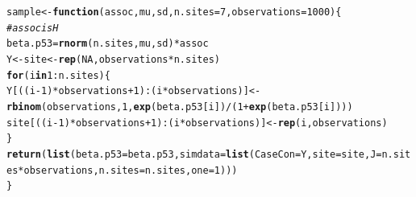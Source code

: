 \documentclass[AMA,STIX1COL]{WileyNJD-v2}\usepackage[]{graphicx}\usepackage[]{color}
\makeatletter
\newcommand{\hlnum}[1]{\textcolor[rgb]{0.686,0.059,0.569}{#1}}%
\newcommand{\hlcom}[1]{\textcolor[rgb]{0.678,0.584,0.686}{\textit{#1}}}%
\newcommand{\hlopt}[1]{\textcolor[rgb]{0,0,0}{#1}}%
\newcommand{\hlstd}[1]{\textcolor[rgb]{0.345,0.345,0.345}{#1}}%
\newcommand{\hlkwa}[1]{\textcolor[rgb]{0.161,0.373,0.58}{\textbf{#1}}}%
\newcommand{\hlkwb}[1]{\textcolor[rgb]{0.69,0.353,0.396}{#1}}%
\newcommand{\hlkwc}[1]{\textcolor[rgb]{0.333,0.667,0.333}{#1}}%
\newcommand{\hlkwd}[1]{\textcolor[rgb]{0.737,0.353,0.396}{\textbf{#1}}}%
\newenvironment{kframe}{%
 \def\at@end@of@kframe{}%
 \ifinner\ifhmode%
  \def\at@end@of@kframe{\end{minipage}}%
  \begin{minipage}{\columnwidth}%
 \fi\fi%
 \def\FrameCommand##1{\hskip\@totalleftmargin \hskip-\fboxsep
 \colorbox{shadecolor}{##1}\hskip-\fboxsep
     \hskip-\linewidth \hskip-\@totalleftmargin \hskip\columnwidth}%
 \MakeFramed {\advance\hsize-\width
   \@totalleftmargin\z@ \linewidth\hsize
   \@setminipage}}%
 {\par\unskip\endMakeFramed%
 \at@end@of@kframe}
\newenvironment{knitrout}{}{} %
\makeatother
\begin{document}
\begin{knitrout}
\begin{kframe}
\begin{alltt}
\hlstd{sample}\hlkwb{<-} \hlkwa{function}\hlstd{(}\hlkwc{assoc}\hlstd{,} \hlkwc{mu}\hlstd{,} \hlkwc{sd}\hlstd{,} \hlkwc{n.sites}\hlstd{=}\hlnum{7}\hlstd{,}\hlkwc{observations} \hlstd{=} \hlnum{1000}\hlstd{)\{}
  \hlcom{#assoc is H}
  \hlstd{beta.p53} \hlkwb{=} \hlkwd{rnorm}\hlstd{(n.sites,mu,sd)}\hlopt{*}\hlstd{assoc}
  \hlstd{Y} \hlkwb{<-}\hlstd{site} \hlkwb{<-} \hlkwd{rep}\hlstd{(}\hlnum{NA}\hlstd{, observations}\hlopt{*}\hlstd{n.sites)}
  \hlkwa{for}\hlstd{(i} \hlkwa{in} \hlnum{1}\hlopt{:}\hlstd{n.sites)\{}
    \hlstd{Y[((i}\hlopt{-}\hlnum{1}\hlstd{)}\hlopt{*}\hlstd{observations}\hlopt{+}\hlnum{1}\hlstd{)}\hlopt{:}\hlstd{(i}\hlopt{*}\hlstd{observations)]}\hlkwb{<-}\hlkwd{rbinom}\hlstd{(observations,} \hlnum{1}\hlstd{,} \hlkwd{exp}\hlstd{(beta.p53[i])}\hlopt{/}\hlstd{(}\hlnum{1}\hlopt{+}\hlkwd{exp}\hlstd{(beta.p53[i])))}
    \hlstd{site[((i}\hlopt{-}\hlnum{1}\hlstd{)}\hlopt{*}\hlstd{observations}\hlopt{+}\hlnum{1}\hlstd{)}\hlopt{:}\hlstd{(i}\hlopt{*}\hlstd{observations)]}\hlkwb{<-} \hlkwd{rep}\hlstd{(i, observations)}
  \hlstd{\}}
  \hlkwd{return}\hlstd{(}\hlkwd{list}\hlstd{(}\hlkwc{beta.p53}\hlstd{=beta.p53,} \hlkwc{simdata} \hlstd{=} \hlkwd{list}\hlstd{(}\hlkwc{CaseCon}\hlstd{=Y,} \hlkwc{site}\hlstd{=site,}  \hlkwc{J}\hlstd{=n.sites}\hlopt{*}\hlstd{observations ,}\hlkwc{n.sites}\hlstd{=n.sites,} \hlkwc{one}\hlstd{=}\hlnum{1}\hlstd{)))}
\hlstd{\}}


\end{alltt}
\end{kframe}
\end{knitrout}
\end{document}
